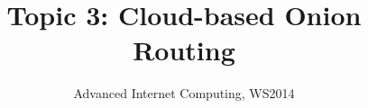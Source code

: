 \documentclass{sig-alternate}
\begin{document}
%

\title{Topic 3: Cloud-based Onion Routing}
\subtitle{Advanced Internet Computing, WS2014}

%
%
%
%
%
\end{document}
